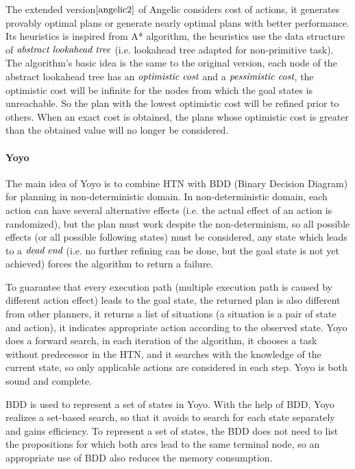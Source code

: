 The extended version$\cite{angelic2}$ of Angelic considers cost of actions, it generates provably optimal plans or generate nearly optimal plans with better performance. Its heuristics is inspired from A* algorithm, the heuristics use the data structure of $\emph{abstract lookahead tree}$ (i.e. lookahead tree adapted for non-primitive task). The algorithm’s basic idea is the same to the original version, each node of the abstract lookahead tree has an $\emph{optimistic cost}$ and a $\emph{pessimistic cost}$, the optimistic cost will be infinite for the nodes from which the goal states is unreachable. So the plan with the lowest optimistic cost will be refined prior to others. When an exact cost is obtained, the plans whose optimistic cost is greater than the obtained value will no longer be considered.

\paragraph*{Yoyo}
The main idea of Yoyo\cite{yoyo} is to combine HTN with BDD (Binary Decision Diagram) for planning in non-deterministic domain. In non-deterministic domain, each action can have several alternative effects (i.e. the actual effect of an action is randomized), but the plan must work despite the non-determinism, so all possible effects (or all possible following states) must be considered, any state which leads to a $\emph{dead end}$ (i.e. no further refining can be done, but the goal state is not yet achieved) forces the algorithm to return a failure. 

To guarantee that every execution path (multiple execution path is caused by different action effect) leads to the goal state, the returned plan is also different from other planners, it returns a list of situations (a situation is a pair of state and action), it indicates appropriate action according to the observed state. Yoyo does a forward search, in each iteration of the algorithm, it chooses a task without predecessor in the HTN, and it searches with the knowledge of the current state, so only applicable actions are considered in each step. Yoyo is both sound and complete. 

BDD is used to represent a set of states in Yoyo. With the help of BDD, Yoyo realizes a set-based search, so that it avoids to search for each state separately and gains efficiency. To represent a set of states, the BDD does not need to list the propositions for which both arcs lead to the same terminal node, so an appropriate use of BDD also reduces the memory consumption.


